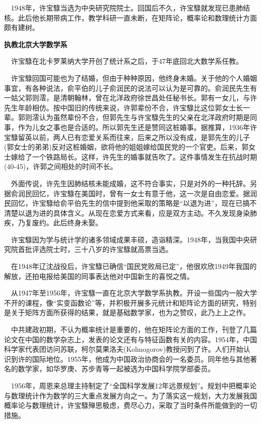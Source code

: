 \documentclass[a4paper,AutoFakeBold,oneside,12pt]{article}
\begin{document}
$\quad$1948年，许宝騄当选为中央研究院院士。回国后不久，许宝騄就发现已患肺结核。此后他长期带病工作，教学科研一直未断，在矩阵论，概率论和数理统计方面颇有建树。

	\textbf{执教北京大学数学系}

$\quad$许宝騄在北卡罗莱纳大学开创了统计系之后，于47年底回北大数学系任教。

$\quad$许宝騄回国可能也为了结婚，但由于种种原因，他终身未婚。关于他的个人婚姻事宜，有各种说法，俞平伯的儿子俞润民的说法可以认为是可靠的。俞润民先生有一姑父郭则澐，是清朝翰林，曾在北洋政府徐世昌处任秘书长。郭有一女儿，与许先生年龄相仿。按中国旧的传统来说，许郭辈份不合，许宝騄比这位郭女士长一辈。郭则澐认为虽然辈份不合，但郭先生与许宝騄先生的父亲在北洋政府时期是同事，作为儿女之事也是合适的。所以郭先生还是赞同这桩婚事。据推算，1936年许宝騄留英以前，两人已有恋爱关系而往来，后来之所以没有成，是郭先生的儿子(郭女士的弟弟)反对这桩婚姻，欲将他的姐姐嫁给国民党的一个官吏。后来，郭女士嫁给了一个铁路局长。这样，许先生的婚事就告吹了。这件事情发生在抗战时期(40-45)，许郭之间相处的时间不长。

	$\quad$外面传说，许先生因肺结核未能成婚，这不符合事实，只是对外的一种托辞。另据俞润民回忆，许宝騄在美国时，曾有一女士有意于他，这一次是自由恋爱。据润民回忆，许宝騄给俞平伯先生的信中提到他采取的策略是“以退为进”，现在已搞不清楚以退为进的具体含义。从现在恋爱方式来看，应是双方主动。不久发现身染肺疾，乃复废约。此后终身未娶。

$\quad$许宝騄因为学与统计学的诸多领域成果丰硕，造诣精深。1948年，当我国中央研究院首批评选院士时，三十八岁的许宝騄就高票当选。

$\quad$在1948年辽沈战役后，许宝騄已确信“国民党败局已定”，他很欢欣1949年我国的解放，还拍电报给美国的同事表达他对中国新生的喜悦之情。

$\quad$从1947年至1956年，许宝騄一直在北京大学数学系执教。开设一些国内一般大学不开的课程，像“实变函数论”等，并积极开展多元统计和矩阵论方面的研究，特别是关于矩阵方面所获得的结果，就是基础数学家，也为之赞叹，此乃上上之作。

	$\quad$中共建政初期，不认为概率统计是重要的，他在矩阵论方面的工作，刊登了几篇论文在中国的数学杂志上，发表的论文还有与特征函数有关的内容。1954年，中国科学家代表团访问苏联，柯尔莫果洛夫(Kolmogorov)教授问到了许。人们开始认识到许的国际地位。1955年，他成为中国政治协商会的一名委员。同年他与其他著名的数学家，如华罗庚、苏步青等一起被选为中国科学院学部委员。

$\quad$1956年，周恩来总理主持制定了“全国科学发展12年远景规划”。规划中把概率论与数理统计作为数学的三大重点发展方向之一。为了落实这一规划，大力发展我国概率论与数理统计，许宝騄殚思极虑，费尽心力，采取了当时条件所能做到的一切措施。
\end{document}
